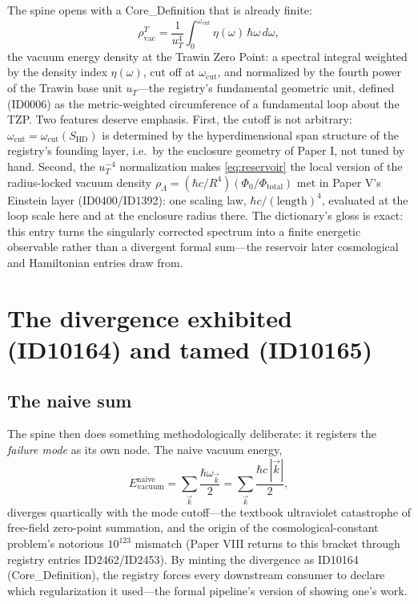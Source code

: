 \documentclass[11pt]{article}
\theoremstyle{remark}
\begin{document}
The spine opens with a Core\_Definition that is already finite:
\begin{equation}
\rho_{\mathrm{vac}}^{T} = \frac{1}{u_T^4} \int_0^{\omega_{\mathrm{cut}}} \eta(\omega)\, \hbar\omega\, d\omega,
\label{eq:reservoir}
\end{equation}
the vacuum energy density at the Trawin Zero Point: a spectral integral weighted by the density index $\eta(\omega)$, cut off at $\omega_{\mathrm{cut}}$, and normalized by the fourth power of the Trawin base unit $u_T$---the registry's fundamental geometric unit, defined (ID0006) as the metric-weighted circumference of a fundamental loop about the TZP. Two features deserve emphasis. First, the cutoff is not arbitrary: $\omega_{\mathrm{cut}} = \omega_{\mathrm{cut}}(S_{\mathrm{HD}})$ is determined by the hyperdimensional span structure of the registry's founding layer, i.e.\ by the enclosure geometry of Paper I, not tuned by hand. Second, the $u_T^{-4}$ normalization makes \eqref{eq:reservoir} the local version of the radius-locked vacuum density $\rho_\Lambda = (\hbar c/R^4)(\Phi_0/\Phi_{\mathrm{total}})$ met in Paper V's Einstein layer (ID0400/ID1392): one scaling law, $\hbar c / (\text{length})^4$, evaluated at the loop scale here and at the enclosure radius there. The dictionary's gloss is exact: this entry turns the singularly corrected spectrum into a finite energetic observable rather than a divergent formal sum---the reservoir later cosmological and Hamiltonian entries draw from.

\section{The divergence exhibited (ID10164) and tamed (ID10165)}
\label{sec:regularization}

\subsection{The naive sum}

The spine then does something methodologically deliberate: it registers the \emph{failure mode} as its own node. The naive vacuum energy,
\begin{equation}
E^{\mathrm{naive}}_{\mathrm{vacuum}} = \sum_{\vec{k}} \frac{\hbar \omega_{\vec{k}}}{2} = \sum_{\vec{k}} \frac{\hbar c\, |\vec{k}|}{2},
\label{eq:naive}
\end{equation}
diverges quartically with the mode cutoff---the textbook ultraviolet catastrophe of free-field zero-point summation, and the origin of the cosmological-constant problem's notorious $10^{123}$ mismatch (Paper VIII returns to this bracket through registry entries ID2462/ID2453). By minting the divergence as ID10164 (Core\_Definition), the registry forces every downstream consumer to declare which regularization it used---the formal pipeline's version of showing one's work.
\end{document}
